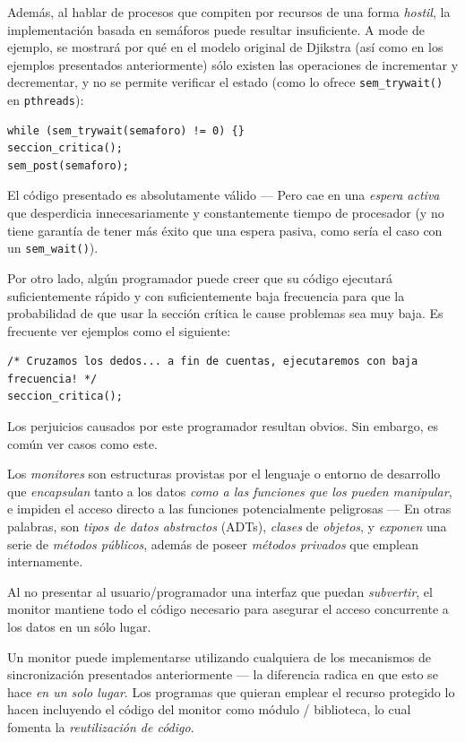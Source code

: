 \documentclass[11pt,fleqn]{book} %
\begin{document}
Además, al hablar de procesos que compiten por recursos de una forma
\emph{hostil}, la implementación basada en semáforos puede resultar
insuficiente. A mode de ejemplo, se mostrará por qué en el modelo
original de Djikstra (así como en los ejemplos presentados
anteriormente) sólo existen las operaciones de incrementar y
decrementar, y no se permite verificar el estado (como lo ofrece
\texttt{sem\_trywait()} en \texttt{pthreads}):


\begin{verbatim}
while (sem_trywait(semaforo) != 0) {}
seccion_critica();
sem_post(semaforo);
\end{verbatim}

El código presentado es absolutamente válido — Pero cae en una
\emph{espera activa} que desperdicia innecesariamente y constantemente
tiempo de procesador (y no tiene garantía de tener más éxito que una
espera pasiva, como sería el caso con un \texttt{sem\_wait()}).

Por otro lado, algún programador puede creer que su código ejecutará
suficientemente rápido y con suficientemente baja frecuencia para que
la probabilidad de que usar la sección crítica le cause problemas sea
muy baja. Es frecuente ver ejemplos como el siguiente:


\begin{verbatim}
/* Cruzamos los dedos... a fin de cuentas, ejecutaremos con baja frecuencia! */
seccion_critica();
\end{verbatim}

Los perjuicios causados por este programador resultan obvios. Sin
embargo, es común ver casos como este.

Los \emph{monitores} son estructuras provistas por el lenguaje o entorno de
desarrollo que \emph{encapsulan} tanto a los datos \emph{como a las funciones que los pueden manipular}, e impiden el acceso directo a las funciones
potencialmente peligrosas — En otras palabras, son \emph{tipos de datos abstractos} (ADTs), \emph{clases} de \emph{objetos}, y \emph{exponen} una serie de
\emph{métodos públicos}, además de poseer \emph{métodos privados} que emplean
internamente.

Al no presentar al usuario/programador una interfaz que puedan
\emph{subvertir}, el monitor mantiene todo el código necesario para
asegurar el acceso concurrente a los datos en un sólo lugar.

Un monitor puede implementarse utilizando cualquiera de los
mecanismos de sincronización presentados anteriormente — la
diferencia radica en que esto se hace \emph{en un solo lugar}. Los
programas que quieran emplear el recurso protegido lo hacen
incluyendo el código del monitor como módulo / biblioteca, lo cual fomenta
la \emph{reutilización de código}.
\end{document}
